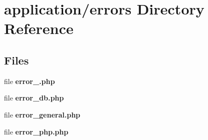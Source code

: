 \section{application/errors Directory Reference}
\label{dir_9db3ef201d4d5e806f053aae43224a08}
\subsection*{Files}
\begin{DoxyCompactItemize}
\item 
file {\bf error\-\_.\-php}
\item 
file {\bf error\-\_\-db.\-php}
\item 
file {\bf error\-\_\-general.\-php}
\item 
file {\bf error\-\_\-php.\-php}
\end{DoxyCompactItemize}
